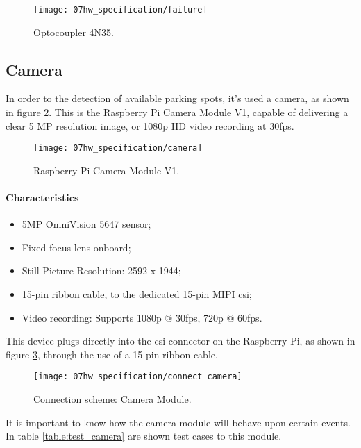 \begin{figure}[H]
	\centering
	\texttt{[image: 07hw\_specification/failure]}
	\caption{Optocoupler 4N35.}
	\label{fig:failure}
\end{figure}

\clearpage
\subsection{Camera}
In order to the detection of available parking spots, it's used a camera, as shown in figure \ref{fig:camera}. This is the Raspberry Pi Camera Module V1, capable of delivering a clear 5 MP resolution image, or 1080p HD video recording at 30fps. \cite{camera}

\begin{figure}[H]
	\centering
	\texttt{[image: 07hw\_specification/camera]}
	\caption{Raspberry Pi Camera Module V1.}
	\label{fig:camera}
\end{figure}

\paragraph*{Characteristics}
\begin{itemize}
	\item 5MP OmniVision 5647 sensor;
	\item Fixed focus lens onboard;
	\item Still Picture Resolution: 2592 x 1944;
	\item 15-pin ribbon cable, to the dedicated 15-pin MIPI \ac{csi};
	\item Video recording: Supports 1080p @ 30fps, 720p @ 60fps.
\end{itemize}

\clearpage
{}
This device plugs directly into the \ac{csi} connector on the Raspberry Pi, as shown in figure \ref{fig:connect_camera}, through the use of a 15-pin ribbon cable.

\begin{figure}[ht]
	\centering
	\texttt{[image: 07hw\_specification/connect\_camera]}
	\caption{Connection scheme: Camera Module.}
	\label{fig:connect_camera}
\end{figure}

It is important to know how the camera module will behave upon certain events. In table \ref{table:test_camera} are shown test cases to this module.

